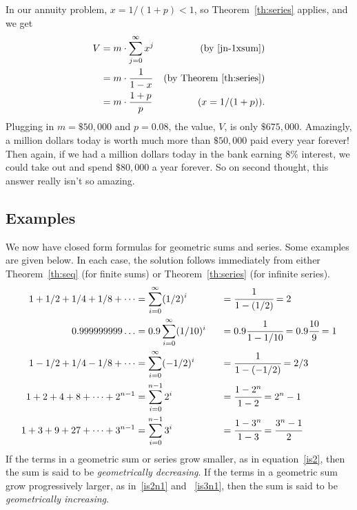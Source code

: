 In our annuity problem, $x=1/(1+p) < 1$, so Theorem~\ref{th:series}
applies, and we get
\begin{align*}
V & = m \cdot \sum_{j=0}^{\infty} x^j & \text{(by \eqref{jn-1xsum})}\\
  &= m\cdot \frac{1}{1-x} & \text{(by Theorem~\ref{th:series})}\\
  &= m\cdot \frac{1 + p}{p} &(x = 1/(1+p)).
\end{align*}
Plugging in $m = \$50,000$ and $p = 0.08$, the value, $V$, is only
$\$675,000$.  Amazingly, a million dollars today is worth much more than
$\$50,000$ paid every year forever!  Then again, if we had a million
dollars today in the bank earning 8\% interest, we could take out and
spend $\$80,000$ a year forever.  So on second thought, this answer really
isn't so amazing.

\iffalse
\subsection{Examples}

We now have closed form formulas for geometric sums and series.  Some
examples are given below.  In each case, the solution follows immediately
from either Theorem~\ref{th:seq} (for finite sums) or
Theorem~\ref{th:series} (for infinite series).
\begin{alignat}{3}
1 + 1/2 + 1/4 + 1/8 + \cdots &=\sum_{i=0}^\infty (1/2)^i
                             &\;\;&=\cfrac{1}{1-(1/2)}
                               =2 \label{is2}
\\
0.999999999\dots             &=0.9 \sum_{i=0}^{\infty} (1/10)^i
                             &&=0.9\cfrac{1}{1-1/10}
                               =0.9\cfrac{10}{9} 
                               =1 \label{is1}
\\
1 - 1/2 + 1/4 - 1/8 + \cdots &=\sum_{i=0}^\infty (-1/2)^i
                             &&=\cfrac{1}{1-(-1/2)}
                               =2/3 \label{is23}
\\
1 + 2 + 4 + 8 + \cdots + 2^{n-1} &=\sum_{i=0}^{n-1} 2^i
                                 &&=\cfrac{1 - 2^n}{1 - 2}
                                   =2^n - 1 \label{is2n1}
\\
1 + 3 + 9 + 27 + \cdots + 3^{n-1} &=\sum_{i=0}^{n-1} 3^i
                                  &&=\cfrac{1 - 3^n}{1 - 3}
                                    =\cfrac{3^n - 1}{2} \label{is3n1}
\end{alignat}
If the terms in a geometric sum or series grow smaller, as in
equation~\eqref{is2}, then the sum is said to be {\em geometrically
decreasing}.  If the terms in a geometric sum grow progressively larger,
as in~\eqref{is2n1} and ~\eqref{is3n1}, then the sum is said to be {\em
geometrically increasing}.

